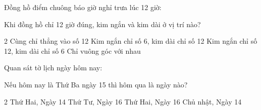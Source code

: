 \begin{ex} %
Đồng hồ điểm chuông báo giờ nghỉ trưa lúc 12 giờ:
\begin{center}\vspace{-2.5mm}
\vspace{-2.5mm}\end{center}
Khi đồng hồ chỉ 12 giờ đúng, kim ngắn và kim dài ở vị trí nào?
\begin{multicols}{2}
\choice
{\True Cùng chỉ thẳng vào số 12}
{Kim ngắn chỉ số 6, kim dài chỉ số 12}
{Kim ngắn chỉ số 12, kim dài chỉ số 6}
{Chỉ vuông góc với nhau}
\end{multicols}
\end{ex}

\newpage

\begin{ex} %
Quan sát tờ lịch ngày hôm nay:
\begin{center}\vspace{-2.5mm}
\vspace{-2.5mm}\end{center}
Nếu hôm nay là Thứ Ba ngày 15 thì hôm qua là ngày nào?
\begin{multicols}{2}
\choice
{\True Thứ Hai, Ngày 14}
{Thứ Tư, Ngày 16}
{Thứ Hai, Ngày 16}
{Chủ nhật, Ngày 14}
\end{multicols}
\end{ex}

